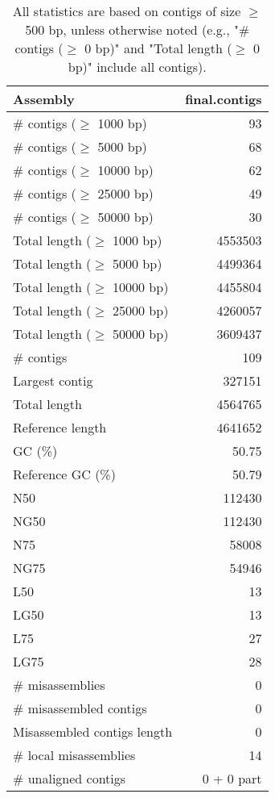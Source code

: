 \documentclass[12pt,a4paper]{article}
\begin{document}
\begin{table}[ht]
\begin{center}
\caption{All statistics are based on contigs of size $\geq$ 500 bp, unless otherwise noted (e.g., "\# contigs ($\geq$ 0 bp)" and "Total length ($\geq$ 0 bp)" include all contigs).}
\begin{tabular}{|l*{1}{|r}|}
\hline
Assembly & final.contigs \\ \hline
\# contigs ($\geq$ 1000 bp) & 93 \\ \hline
\# contigs ($\geq$ 5000 bp) & 68 \\ \hline
\# contigs ($\geq$ 10000 bp) & 62 \\ \hline
\# contigs ($\geq$ 25000 bp) & 49 \\ \hline
\# contigs ($\geq$ 50000 bp) & 30 \\ \hline
Total length ($\geq$ 1000 bp) & 4553503 \\ \hline
Total length ($\geq$ 5000 bp) & 4499364 \\ \hline
Total length ($\geq$ 10000 bp) & 4455804 \\ \hline
Total length ($\geq$ 25000 bp) & 4260057 \\ \hline
Total length ($\geq$ 50000 bp) & 3609437 \\ \hline
\# contigs & 109 \\ \hline
Largest contig & 327151 \\ \hline
Total length & 4564765 \\ \hline
Reference length & 4641652 \\ \hline
GC (\%) & 50.75 \\ \hline
Reference GC (\%) & 50.79 \\ \hline
N50 & 112430 \\ \hline
NG50 & 112430 \\ \hline
N75 & 58008 \\ \hline
NG75 & 54946 \\ \hline
L50 & 13 \\ \hline
LG50 & 13 \\ \hline
L75 & 27 \\ \hline
LG75 & 28 \\ \hline
\# misassemblies & 0 \\ \hline
\# misassembled contigs & 0 \\ \hline
Misassembled contigs length & 0 \\ \hline
\# local misassemblies & 14 \\ \hline
\# unaligned contigs & 0 + 0 part \\ \hline

\end{tabular}
\end{center}
\end{table}
\end{document}

